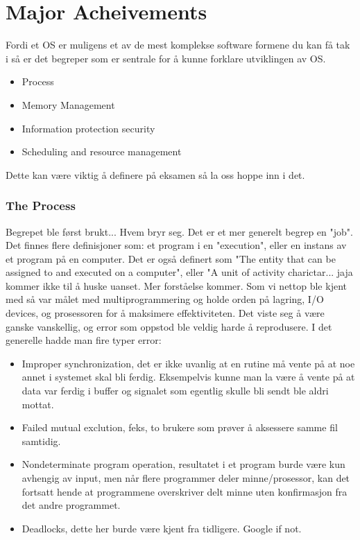 \section{Major Acheivements}
Fordi et OS er muligens et av de mest komplekse software formene du kan få tak i så er det begreper som er sentrale for å kunne forklare utviklingen av OS.
\begin{itemize}
\item Process
\item Memory Management
\item Information protection security
\item Scheduling and resource management
\end{itemize}

Dette kan være viktig å definere på eksamen så la oss hoppe inn i det.
\subsubsection{The Process}
Begrepet ble først brukt... Hvem bryr seg. Det er et mer generelt begrep en "job". Det finnes flere definisjoner som: et program i en "execution", eller en instans av et program på en computer. Det er også definert som "The entity that can be assigned to and executed on a computer", eller "A unit of activity charictar... jaja kommer ikke til å huske uanset. Mer forståelse kommer. 
\newline\newline
Som vi nettop ble kjent med så var målet med multiprogrammering og holde orden på lagring, I/O devices, og prosessoren for å maksimere effektiviteten. 
Det viste seg å være ganske vanskellig, og error som oppstod ble veldig harde å reprodusere. I det generelle hadde man fire typer error:
\begin{itemize}
\item Improper synchronization, det er ikke uvanlig at en rutine må vente på at noe annet i systemet skal bli ferdig. Eksempelvis kunne man la være å vente på at data var ferdig i buffer og signalet som egentlig skulle bli sendt ble aldri mottat.
\item Failed mutual exclution, feks, to brukere som prøver å aksessere samme fil samtidig. 
\item Nondeterminate program operation, resultatet i et program burde være kun avhengig av input, men når flere programmer deler minne/prosessor, kan det fortsatt hende at programmene overskriver delt minne uten konfirmasjon fra det andre programmet. 
\item Deadlocks, dette her burde være kjent fra tidligere. Google if not.
\end{itemize}

